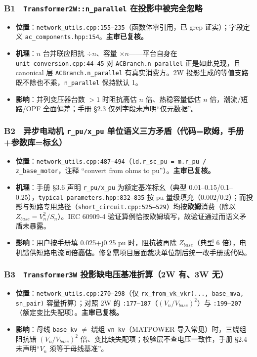 \documentclass[11pt,a4paper,fontset=fandol]{ctexart}
\newcommand{\file}[1]{\texttt{#1}}
\begin{document}
\subsubsection*{B1　\texttt{Transformer2W::n\_parallel} 在投影中被完全忽略}
\begin{itemize}
  \item \textbf{位置}：\file{network\_utils.cpp:155--235}（函数体零引用，已 grep 证实）；字段定义 \file{ac\_components.hpp:154}。\textbf{主审已复核。}
  \item \textbf{机理}：$n$ 台并联应阻抗 $\div n$、容量 $\times n$——平台自身在 \file{unit\_conversion.cpp:44--45} 对 \texttt{ACBranch.n\_parallel} 正是如此兑现，且 canonical 层 \texttt{ACBranch.n\_parallel} 有真实消费方。2W 投影生成的等值支路既不除也不乘，\texttt{n\_parallel} 保持默认 1。
  \item \textbf{影响}：并列变压器台数 $>1$ 时阻抗高估 $n$ 倍、热稳容量低估 $n$ 倍，潮流/短路/OPF 全面偏差；手册 \S 2.3 仅列字段未声明``仅元数据''。
\end{itemize}

\subsubsection*{B2　异步电动机 \texttt{r\_pu/x\_pu} 单位语义三方矛盾（代码=欧姆，手册+参数库=标幺）}
\begin{itemize}
  \item \textbf{位置}：\file{network\_utils.cpp:487--494}（\texttt{ld.r\_sc\_pu = m.r\_pu / z\_base\_motor}，注释 ``convert from ohms to pu''）。\textbf{主审已复核。}
  \item \textbf{机理}：手册 \S 3.6 声明 \texttt{r\_pu/x\_pu} 为额定基准标幺（典型 0.01--0.15/0.1--0.25），\file{typical\_parameters.hpp:832--835} 按 pu 量级填充（0.002/0.2）；而投影与短路专用路径（\file{short\_circuit.cpp:525--529}）均按\textbf{欧姆}消费（除以 $Z_{base}=V_n^2/S_n$）。IEC 60909-4 验证算例恰按欧姆填写，故验证通过而语义矛盾未暴露。
  \item \textbf{影响}：用户按手册填 0.025+j0.25 pu 时，阻抗被再除 $Z_{base}$（典型 6 倍），电机馈供短路电流同倍\textbf{高估}。修复需项目层面裁决单位制后统一改手册或代码。
\end{itemize}

\subsubsection*{B3　\texttt{Transformer3W} 投影缺电压基准折算（2W 有、3W 无）}
\begin{itemize}
  \item \textbf{位置}：\file{network\_utils.cpp:270--298}（仅 \texttt{rx\_from\_vk\_vkr(..., base\_mva, sn\_pair)} 容量折算）；对照 2W 的 \file{:177--187}（$(V_n/V_{base})^2$）与 \file{:199--207}（额定变比失配项）。\textbf{主审已复核。}
  \item \textbf{影响}：母线 \texttt{base\_kv} $\neq$ 绕组 \texttt{vn\_kv}（MATPOWER 导入常见）时，三绕组阻抗错 $(V_n/V_{base})^2$ 倍、变比缺失配项；校验层不查电压一致性，手册 \S 2.4 未声明``$V_n$ 须等于母线基准''。
\end{itemize}
\end{document}

